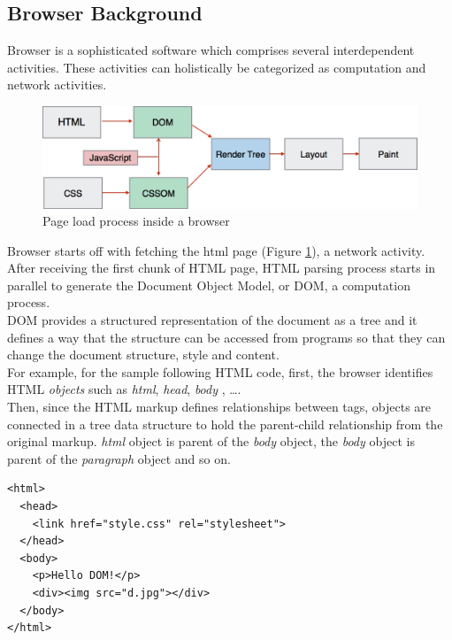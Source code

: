 \subsection{Browser Background}
Browser is a sophisticated software which comprises several interdependent activities. These activities can holistically be categorized as computation and network activities.\\
 \begin{figure}[!htb]
  \centering
    \includegraphics[width=0.85 \textwidth]{./figures/introduction/pageloadprocess.pdf}
  \caption {Page load process inside a browser}
  \label{fig:pageloadprocess}
\end{figure}

\noindent Browser starts off with fetching the html page (Figure \ref{fig:pageloadprocess}), a network activity. After receiving the first chunk of HTML page, HTML parsing process starts in parallel to generate the Document Object Model, or DOM\cite{dom}, a computation process.\\
DOM provides a structured representation of the document as a tree and it defines a way that the structure can be accessed from programs so that they can change the document structure, style and content.\\
\noindent  For example, for the sample following HTML code, first, the browser identifies HTML  {\em objects} such as {\em html}, {\em head}, {\em body} , \ldots.\\
\noindent Then, since the HTML markup defines relationships between tags, objects are connected in a tree data structure to hold the parent-child relationship from the original markup. {\em html} object is parent of the {\em body} object, the {\em body} object is parent of the {\em paragraph} object and so on.
\begin{verbatim}
<html>
  <head>
    <link href="style.css" rel="stylesheet">
  </head>
  <body>
    <p>Hello DOM!</p>
    <div><img src="d.jpg"></div>
  </body>
</html>
\end{verbatim}

